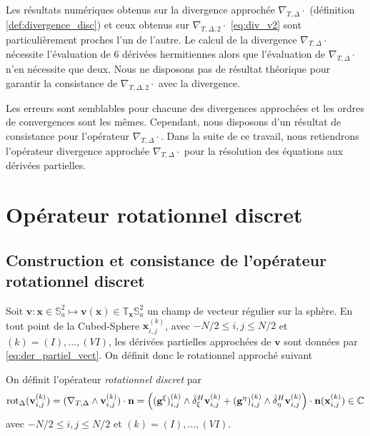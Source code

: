 Les résultats numériques obtenus sur la divergence approchée $\nabla_{T,\Delta} \cdot$ (définition \ref{def:divergence_disc}) et ceux obtenus sur $\nabla_{T,\Delta,2} \cdot$ \eqref{eq:div_v2} sont particulièrement proches l'un de l'autre. Le calcul de la divergence $\nabla_{T,\Delta} \cdot$ nécessite l'évaluation de 6 dérivées hermitiennes alors que l'évaluation de $\nabla_{T,\Delta} \cdot$ n'en nécessite que deux. Nous ne disposons pas de résultat théorique pour garantir la consistance de $\nabla_{T,\Delta,2} \cdot$ avec la divergence.

Les erreurs sont semblables pour chacune des divergences approchées et les ordres de convergences sont les mêmes. Cependant, nous disposons d'un résultat de consistance pour l'opérateur $\nabla_{T,\Delta} \cdot$. Dans la suite de ce travail, nous retiendrons l'opérateur divergence approchée $\nabla_{T,\Delta} \cdot$ pour la résolution des équations aux dérivées partielles.























\section{Opérateur rotationnel discret}

\subsection{Construction et consistance de l'opérateur rotationnel discret}


Soit $\mathbf{v} : \mathbf{x} \in \mathbb{S}_a^2 \mapsto \mathbf{v}(\mathbf{x}) \in \mathbb{T}_{\mathbf{x}} \mathbb{S}_a^2$ un champ de vecteur régulier sur la sphère. En tout point de la Cubed-Sphere $\mathbf{x}_{i,j}^{(k)}$, avec $-N/2 \leq i,j \leq N/2$ et $(k) = (I), ..., (VI)$, les dérivées partielles approchées de $\mathbf{v}$ sont données par \eqref{eq:der_partiel_vect}. On définit donc le rotationnel approché suivant

\begin{definition}
On définit l'opérateur \textit{rotationnel discret} par 
\begin{equation}
\text{rot}_{\Delta} (\mathbf{v}_{i,j}^{(k)}) = (\nabla_{T,\Delta} \wedge \mathbf{v}_{i,j}^{(k)}) \cdot \mathbf{n} = \left( ( \mathbf{g}^{\xi} )_{i,j}^{(k)} \wedge \tilde{\delta}^H_{\xi} \mathbf{v}_{i,j}^{(k)}   + ( \mathbf{g}^{\eta} )_{i,j}^{(k)} \wedge \tilde{\delta}^H_{\eta} \mathbf{v}_{i,j}^{(k)} \right) \cdot \mathbf{n}(\mathbf{x}_{i,j}^{(k)}) \in \mathbb{C}
\end{equation}
avec $-N/2 \leq i,j \leq N/2$ et $(k) = (I), \ldots , (VI)$.
\label{def:rotationnel_disc}
\end{definition}

